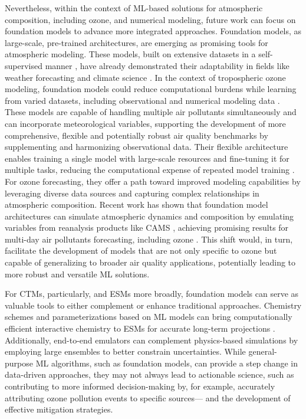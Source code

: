 \documentclass[gmd, manuscript]{copernicus}
\begin{document}
Nevertheless, within the context of ML-based solutions for atmospheric composition, including ozone, and numerical modeling, future work can focus on foundation models to advance more integrated approaches. Foundation models, as large-scale, pre-trained architectures, are emerging as promising tools for atmospheric modeling. These models, built on extensive datasets in a self-supervised manner  \citet{bommasani2021opportunities}, have already demonstrated their adaptability in fields like weather forecasting and climate science \citep{lessig2023atmorep, nguyen2023climax, Bodnar2024}. In the context of tropospheric ozone modeling, foundation models could reduce computational burdens while learning from varied datasets, including observational and numerical modeling data \citep{mukkavilli_ai_2023}. These models are capable of handling multiple air pollutants simultaneously and can incorporate meteorological variables, supporting the development of more comprehensive, flexible and potentially robust air quality benchmarks by supplementing and harmonizing observational data. Their flexible architecture enables training a single model with large-scale resources and fine-tuning it for multiple tasks, reducing the computational expense of repeated model training \citep{bommasani2021opportunities}. For ozone forecasting, they offer a path toward improved modeling capabilities by leveraging diverse data sources and capturing complex relationships in atmospheric composition. Recent work has shown that foundation model architectures can simulate atmospheric dynamics and composition by emulating variables from reanalysis products like CAMS \citep{inness_cams_2019}, achieving promising results for multi-day air pollutants forecasting, including ozone \citep{Bodnar2024}. This shift would, in turn, facilitate the development of models that are not only specific to ozone but capable of generalizing to broader air quality applications, potentially leading to more robust and versatile ML solutions. 

For CTMs, particularly, and ESMs more broadly, foundation models can serve as valuable tools to either complement or enhance traditional approaches. Chemistry schemes and parameterizations based on ML models can bring computationally efficient interactive chemistry to ESMs for accurate long-term projections \citep{Eyring2016}. Additionally, end-to-end emulators can complement physics-based simulations by employing large ensembles to better constrain uncertainties. While general-purpose ML algorithms, such as foundation models, can provide a step change in data-driven approaches, they may not always lead to actionable science, such as contributing to more informed decision-making by, for example, accurately attributing ozone pollution events to specific sources— and the development of effective mitigation strategies.
\end{document}
